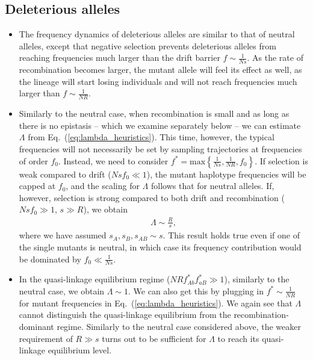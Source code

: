 \documentclass[aps,rmp,twocolumn,groupedaddress,floatfix,notitlepage]{revtex4-1}
\begin{document}
\subsection*{Deleterious alleles}
\begin{itemize}

\item The frequency dynamics of deleterious alleles are similar to that of neutral alleles, except that negative selection prevents deleterious alleles from reaching frequencies much larger than the drift barrier $f \sim \frac{1}{Ns}$. As the rate of recombination becomes larger, the mutant allele will feel its effect as well, as the lineage will start losing individuals and will not reach frequencies much larger than $f \sim \frac{1}{NR}$.

\item Similarly to the neutral case, when recombination is small and as long as there is no epistasis -- which we examine separately below -- we can estimate $\Lambda$ from Eq.~(\ref{eq:lambda_heuristics}). This time, however, the typical frequencies will not necessarily be set by sampling trajectories at frequencies of order $f_0$. Instead, we need to consider $f^* = \mathrm{max}\left\{\frac{1}{Ns}, \frac{1}{NR}, f_0 \right\}$. If selection is weak compared to drift ($Nsf_0 \ll 1$), the mutant haplotype frequencies will be capped at $f_0$, and the scaling for $\Lambda$ follows that for neutral alleles. If, however, selection is strong compared to both drift and recombination ($Nsf_0 \gg 1$, $s \gg R$), we obtain 
\begin{align}
    \Lambda \sim \frac{R}{s},
\end{align}
where we have assumed $s_{A}, s_{B}, s_{AB} \sim s$. This result holds true even if one of the single mutants is neutral, in which case its frequency contribution would be dominated by $f_0 \ll \frac{1}{Ns}$.


\item In the quasi-linkage equilibrium regime ($NR f^*_{Ab} f^*_{aB} \gg 1$), similarly to the neutral case, we obtain $\Lambda \sim 1$. We can also get this by plugging in $f^* \sim \frac{1}{NR}$ for mutant frequencies in Eq.~(\ref{eq:lambda_heuristics}). We again see that $\Lambda$ cannot distinguish the quasi-linkage equilibrium from the recombination-dominant regime. Similarly to the neutral case considered above, the weaker requirement of $R \gg s$ turns out to be sufficient for $\Lambda$ to reach its quasi-linkage equilibrium level.


\end{itemize}
\end{document}
